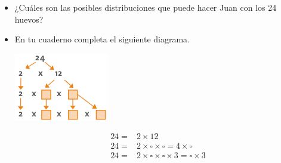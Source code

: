 \documentclass[10pt,twoside]{article}
\begin{document}
\begin{itemize}
\item ¿Cuáles son las posibles distribuciones que puede hacer
Juan con los 24 huevos?
\item En tu cuaderno completa el siguiente diagrama.
\begin{minipage}{.4\textwidth}
\includegraphics[scale=.75]{Images/diagramadel24.png} 
\end{minipage}\hfill
\begin{minipage}{.5\textwidth}
\begin{align*}
24=&2\times 12\\
24=&2\times \square \times \square = 4 \times \square \\
24=&2\times \square \times \square \times 3=\square \times 3
\end{align*}
\end{minipage}
\end{itemize}
\end{document}
